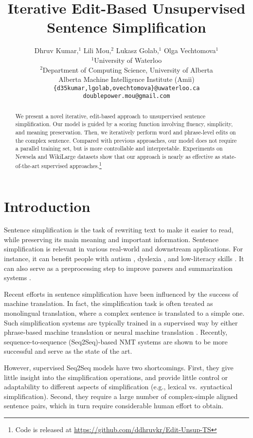 \documentclass[11pt,a4paper]{article}
\title{Iterative Edit-Based Unsupervised Sentence Simplification}
\author{Dhruv Kumar,$^1$ Lili Mou,$^2$ Lukasz Golab,$^1$ Olga Vechtomova$^1$\\
  $^1$University of Waterloo \\
  $^2$Department of Computing Science, University of Alberta\\ Alberta Machine Intelligence Institute (Amii)\\
  \texttt{\{d35kumar,lgolab,ovechtomova\}@uwaterloo.ca} \\
  \texttt{doublepower.mou@gmail.com}}
\date{}
\begin{document}
\maketitle
\begin{abstract}
We present a novel {iterative}, edit-based approach to unsupervised sentence simplification. Our model is guided by a scoring function involving fluency, simplicity, and meaning preservation. Then, we iteratively perform word and phrase-level edits on the complex sentence. Compared with previous approaches, our model does not require a parallel training set, but is more controllable and interpretable. Experiments on  Newsela and WikiLarge datasets show that our approach is nearly as effective as state-of-the-art supervised approaches.\footnote{Code is released at \url{https://github.com/ddhruvkr/Edit-Unsup-TS}}
\end{abstract}

\section{Introduction}

Sentence simplification is the task of rewriting text to make it easier to read, while preserving its main meaning and important information. 
Sentence simplification is relevant in various real-world and downstream applications.
For instance, it can benefit people with autism \cite{evans2014evaluation},
 dyslexia \cite{rello2013dyswebxia}, and  low-literacy skills \cite{watanabe2009facilita}.
It can also serve as a preprocessing step to improve parsers \cite{chandrasekar-etal-1996-motivations}
and summarization systems \cite{klebanov2004text}.


Recent efforts in sentence simplification have been influenced by the success of machine translation. In fact, the simplification task is often treated as monolingual translation, where a complex sentence is translated to a simple one. Such simplification systems are typically trained in a supervised way by either phrase-based machine translation \cite[PBMT,][]{wubben2012sentence, narayan2014hybrid, xu-etal-2016-optimizing} or neural machine translation  \cite[NMT,][]{zhang2017sentence, guo2018dynamic, kriz2019complexity}. Recently, sequence-to-sequence (Seq2Seq)-based NMT systems are
shown to be more successful and serve as the state of the art. 


However, supervised Seq2Seq models have two shortcomings. First, they give little insight into the simplification operations, and provide little control or adaptability to different aspects of simplification (e.g., lexical vs.~syntactical simplification).
Second, they require a large number of complex-simple aligned sentence pairs, which in turn require considerable human effort to obtain.
\end{document}
